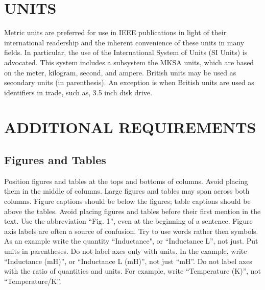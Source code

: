 \documentclass[letterpaper, 10 pt, conference]{ieeeconf}  %
\begin{document}
\section{UNITS}

Metric units are preferred for use in IEEE publications in light of their
international readership and the inherent convenience of these units in many fields.
In particular, the use of the International System of Units (SI Units) is advocated.
 This system includes a subsystem the MKSA units, which are based on the
 meter, kilogram, second, and ampere. British units may be used as secondary units
 (in parenthesis). An exception is when British units are used as identifiers in trade,
 such as, 3.5 inch disk drive.


\addtolength{\textheight}{-3cm}   %

\section{ADDITIONAL REQUIREMENTS}

\subsection{Figures and Tables}

Position figures and tables at the tops and bottoms of columns.
Avoid placing them in the middle of columns. Large figures and tables
may span across both columns. Figure captions should be below the figures;
 table captions should be above the tables. Avoid placing figures and tables
  before their first mention in the text. Use the abbreviation ``Fig. 1'',
  even at the beginning of a sentence.
Figure axis labels are often a source of confusion.
Try to use words rather then symbols. As an example write the quantity ``Inductance",
 or ``Inductance L'', not just.
 Put units in parentheses. Do not label axes only with units.
 In the example, write ``Inductance (mH)'', or ``Inductance L (mH)'', not just ``mH''.
 Do not label axes with the ratio of quantities and units.
 For example, write ``Temperature (K)'', not ``Temperature/K''.
\end{document}
